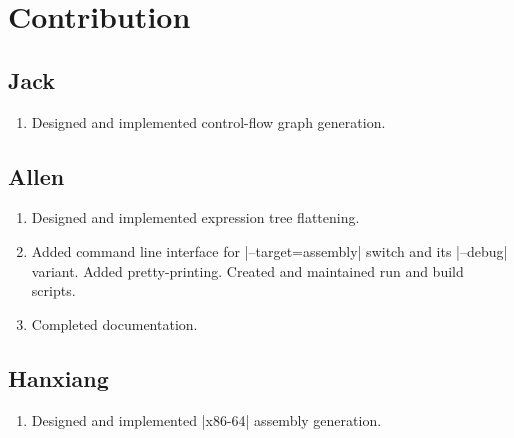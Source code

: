 \newpage

\section{Contribution}

\subsection{Jack}
\begin{enumerate}
    \item Designed and implemented control-flow graph generation.
\end{enumerate}

\subsection{Allen}
\begin{enumerate}
    \item Designed and implemented expression tree flattening.
    \item Added command line interface for |--target=assembly| switch and its |--debug| variant. Added pretty-printing. Created and maintained run and build scripts.
    \item Completed documentation.
\end{enumerate}

\subsection{Hanxiang}
\begin{enumerate}
    \item Designed and implemented |x86-64| assembly generation.
\end{enumerate}